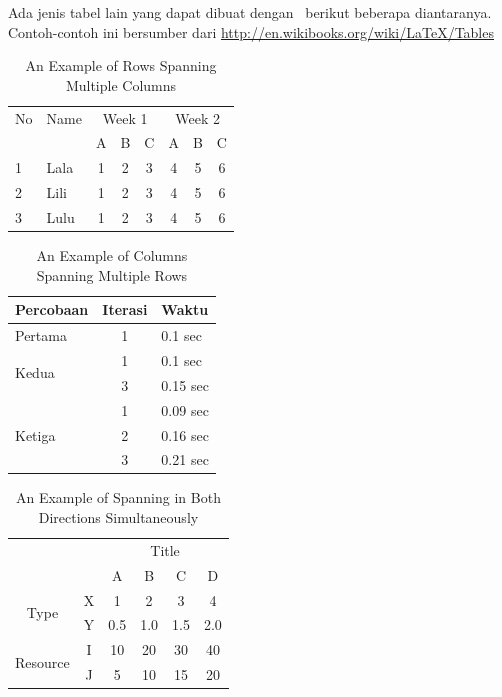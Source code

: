 Ada jenis tabel lain yang dapat dibuat dengan \latex~berikut 
beberapa diantaranya. Contoh-contoh ini bersumber dari 
\url{http://en.wikibooks.org/wiki/LaTeX/Tables}

\begin{table}
	\centering
	\caption{An Example of Rows Spanning Multiple Columns}
	\label{row.spanning}
	\begin{tabular}{|l|l|*{6}{c|}}
  		\hline %
  		No & Name & \multicolumn{3}{|c|}{Week 1} & \multicolumn{3}{|c|}{Week 2} \\
  		\cline{3-8} %
  		& & A & B & C & A & B & C\\
  		\hline
  		1 & Lala & 1 & 2 & 3 & 4 & 5 & 6\\
  		2 & Lili & 1 & 2 & 3 & 4 & 5 & 6\\
  		3 & Lulu & 1 & 2 & 3 & 4 & 5 & 6\\
  		\hline
	\end{tabular}
\end{table}

\begin{table}
	\centering
	\caption{An Example of Columns Spanning Multiple Rows}
	\label{column.spanning}
	\begin{tabular}{|l|c|l|}
		\hline
		Percobaan & Iterasi & Waktu \\
		\hline
		Pertama & 1 & 0.1 sec \\ \hline
		\multirow{2}{*}{Kedua} & 1 & 0.1 sec \\
 		& 3 & 0.15 sec \\ 
 		\hline
		\multirow{3}{*}{Ketiga} & 1 & 0.09 sec \\
 		& 2 & 0.16 sec \\
 		& 3 & 0.21 sec \\ 
 		\hline
	\end{tabular}
\end{table}

\begin{table}
	\centering
	\caption{An Example of Spanning in Both Directions Simultaneously}
	\label{mix.spanning}
	\begin{tabular}{cc|c|c|c|c|}
		\cline{3-6}
		& & \multicolumn{4}{|c|}{Title} \\ \cline{3-6}
		& & A & B & C & D \\ \hline
		\multicolumn{1}{|c|}{\multirow{2}{*}{Type}} &
		\multicolumn{1}{|c|}{X} & 1 & 2 & 3 & 4\\ \cline{2-6}
		\multicolumn{1}{|c|}{}                        &
		\multicolumn{1}{|c|}{Y} & 0.5 & 1.0 & 1.5 & 2.0\\ \cline{1-6}
		\multicolumn{1}{|c|}{\multirow{2}{*}{Resource}} &
		\multicolumn{1}{|c|}{I} & 10 & 20 & 30 & 40\\ \cline{2-6}
		\multicolumn{1}{|c|}{}                        &
		\multicolumn{1}{|c|}{J} & 5 & 10 & 15 & 20\\ \cline{1-6}
	\end{tabular}
\end{table}